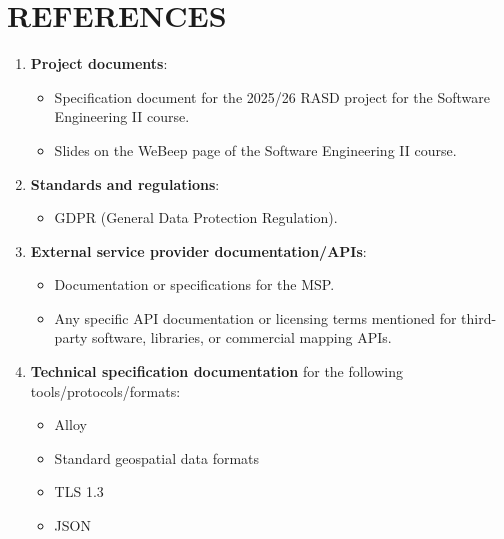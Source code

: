 \documentclass{article}
\begin{document}
\section{REFERENCES}
\begin{enumerate}
    \item \textbf{Project documents}:
        \begin{itemize}
            \item Specification document for the 2025/26 RASD project for the Software Engineering II course.
            \item Slides on the WeBeep page of the Software Engineering II course.
        \end{itemize}
    \item \textbf{Standards and regulations}:
        \begin{itemize}
            \item GDPR (General Data Protection Regulation).
        \end{itemize}
    \item \textbf{External service provider documentation/APIs}:
        \begin{itemize}
            \item Documentation or specifications for the MSP.
            \item Any specific API documentation or licensing terms mentioned for third-party software, libraries, or commercial mapping APIs.
        \end{itemize}
    \item \textbf{Technical specification documentation} for the following tools/protocols/formats:
        \begin{itemize}
            \item Alloy
            \item Standard geospatial data formats
            \item TLS 1.3
            \item JSON
        \end{itemize}
\end{enumerate}
\end{document}
